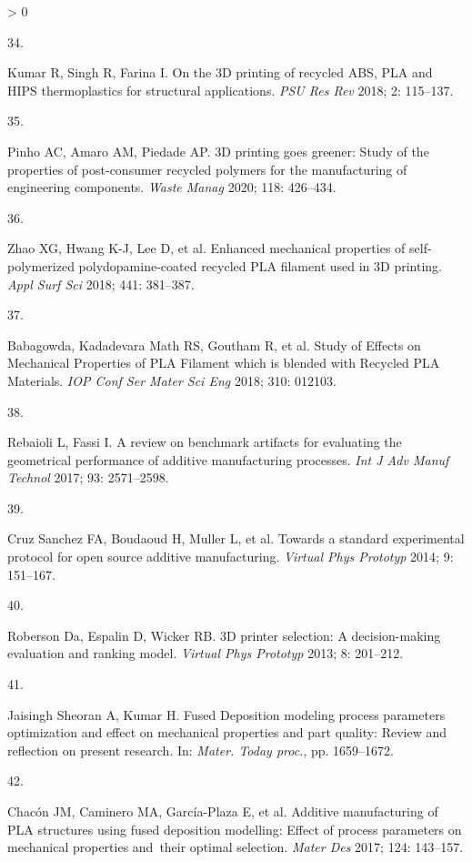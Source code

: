 \documentclass[
  12pt]{article}
\newlength{\cslhangindent}
\newlength{\csllabelwidth}
\newenvironment{CSLReferences}[2] %
 {%
  \setlength{\parindent}{0pt}
  \ifodd #1 \everypar{\setlength{\hangindent}{\cslhangindent}}\ignorespaces\fi
  \ifnum #2 > 0
  \setlength{\parskip}{#2\baselineskip}
  \fi
 }%
 {}
\newcommand{\CSLLeftMargin}[1]{\parbox[t]{\csllabelwidth}{#1}}
\newcommand{\CSLRightInline}[1]{\parbox[t]{\linewidth - \csllabelwidth}{#1}\break}
\begin{document}
\begin{CSLReferences}{0}{0}
\leavevmode\hypertarget{ref-Kumar2018b}{}%
\CSLLeftMargin{34. }
\CSLRightInline{Kumar R, Singh R, Farina I. {On the 3D printing of recycled ABS, PLA and HIPS thermoplastics for structural applications}. \emph{PSU Res Rev} 2018; 2: 115--137.}

\leavevmode\hypertarget{ref-Pinho2020}{}%
\CSLLeftMargin{35. }
\CSLRightInline{Pinho AC, Amaro AM, Piedade AP. {3D printing goes greener: Study of the properties of post-consumer recycled polymers for the manufacturing of engineering components}. \emph{Waste Manag} 2020; 118: 426--434.}

\leavevmode\hypertarget{ref-Zhao2018a}{}%
\CSLLeftMargin{36. }
\CSLRightInline{Zhao XG, Hwang K-J, Lee D, et al. {Enhanced mechanical properties of self-polymerized polydopamine-coated recycled PLA filament used in 3D printing}. \emph{Appl Surf Sci} 2018; 441: 381--387.}

\leavevmode\hypertarget{ref-Babagowda2018}{}%
\CSLLeftMargin{37. }
\CSLRightInline{Babagowda, Kadadevara Math RS, Goutham R, et al. {Study of Effects on Mechanical Properties of PLA Filament which is blended with Recycled PLA Materials}. \emph{IOP Conf Ser Mater Sci Eng} 2018; 310: 012103.}

\leavevmode\hypertarget{ref-Rebaioli2017}{}%
\CSLLeftMargin{38. }
\CSLRightInline{Rebaioli L, Fassi I. {A review on benchmark artifacts for evaluating the geometrical performance of additive manufacturing processes}. \emph{Int J Adv Manuf Technol} 2017; 93: 2571--2598.}

\leavevmode\hypertarget{ref-CruzSanchez2014}{}%
\CSLLeftMargin{39. }
\CSLRightInline{Cruz Sanchez FA, Boudaoud H, Muller L, et al. {Towards a standard experimental protocol for open source additive manufacturing}. \emph{Virtual Phys Prototyp} 2014; 9: 151--167.}

\leavevmode\hypertarget{ref-Roberson2013}{}%
\CSLLeftMargin{40. }
\CSLRightInline{Roberson Da, Espalin D, Wicker RB. {3D printer selection: A decision-making evaluation and ranking model}. \emph{Virtual Phys Prototyp} 2013; 8: 201--212.}

\leavevmode\hypertarget{ref-JaisinghSheoran2019}{}%
\CSLLeftMargin{41. }
\CSLRightInline{Jaisingh Sheoran A, Kumar H. {Fused Deposition modeling process parameters optimization and effect on mechanical properties and part quality: Review and reflection on present research}. In: \emph{Mater. Today proc.}, pp. 1659--1672.}

\leavevmode\hypertarget{ref-Chacon2017}{}%
\CSLLeftMargin{42. }
\CSLRightInline{Chacón JM, Caminero MA, García-Plaza E, et al. {Additive manufacturing of PLA structures using fused deposition modelling: Effect of process parameters on mechanical properties and~their optimal selection}. \emph{Mater Des} 2017; 124: 143--157.}


\end{CSLReferences}
\end{document}
